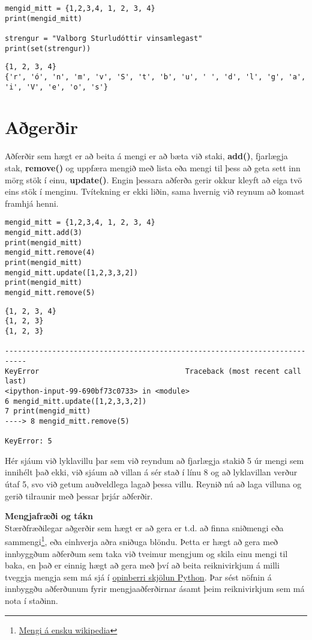 \begin{lstlisting}[caption=Mengi skilgreind, label=lst:set-duplicate]
mengid_mitt = {1,2,3,4, 1, 2, 3, 4}
print(mengid_mitt) 

strengur = "Valborg Sturludóttir vinsamlegast"
print(set(strengur))
\end{lstlisting}
\lstset{style=uttak}
\begin{lstlisting}
{1, 2, 3, 4}
{'r', 'ó', 'n', 'm', 'v', 'S', 't', 'b', 'u', ' ', 'd', 'l', 'g', 'a', 'i', 'V', 'e', 'o', 's'}
\end{lstlisting}
\lstset{style=venjulegt}

\section{Aðgerðir}
Aðferðir sem hægt er að beita á mengi er að bæta við staki, \textbf{add()}, fjarlægja stak, \textbf{remove()} og uppfæra mengið með lista eða mengi til þess að geta sett inn mörg stök í einu, \textbf{update()}.
Engin þessara aðferða gerir okkur kleyft að eiga tvö eins stök í menginu.
Tvítekning er ekki liðin, sama hvernig við reynum að komast framhjá henni.

\begin{lstlisting}[caption=Mengja aðferðir, label=lst:set-method]
mengid_mitt = {1,2,3,4, 1, 2, 3, 4}
mengid_mitt.add(3)
print(mengid_mitt)
mengid_mitt.remove(4)
print(mengid_mitt)
mengid_mitt.update([1,2,3,3,2])
print(mengid_mitt)
mengid_mitt.remove(5)
\end{lstlisting}
\lstset{style=uttak}
\begin{lstlisting}
{1, 2, 3, 4}
{1, 2, 3}
{1, 2, 3}

---------------------------------------------------------------------------
KeyError                                  Traceback (most recent call last)
<ipython-input-99-690bf73c0733> in <module>
6 mengid_mitt.update([1,2,3,3,2])
7 print(mengid_mitt)
----> 8 mengid_mitt.remove(5)

KeyError: 5
\end{lstlisting}
\lstset{style=venjulegt}

Hér sjáum við lyklavillu þar sem við reyndum að fjarlægja stakið 5 úr mengi sem innihélt það ekki, við sjáum að villan á sér stað í línu 8 og að lyklavillan verður útaf 5, svo við getum auðveldlega lagað þessa villu.
Reynið nú að laga villuna og gerið tilraunir með þessar þrjár aðferðir.

\begin{itarefni}
\textbf{Mengjafræði og tákn}\\
Stærðfræðilegar aðgerðir sem hægt er að gera er t.d. að finna sniðmengi eða sammengi\footnote{\href{https://en.wikipedia.org/wiki/Set_(mathematics)}{Mengi á ensku wikipedia}}, eða einhverja aðra sniðuga blöndu. Þetta er hægt að gera með innbyggðum aðferðum sem taka við tveimur mengjum og skila einu mengi til baka, en það er einnig hægt að gera með því að beita reiknivirkjum á milli tveggja mengja sem má sjá í \href{https://docs.python.org/3/library/stdtypes.html#set}{opinberri skjölun Python}.
Þar sést nöfnin á innbyggðu aðferðunum fyrir mengjaaðferðirnar ásamt þeim reiknivirkjum sem má nota í staðinn.
\end{itarefni}


